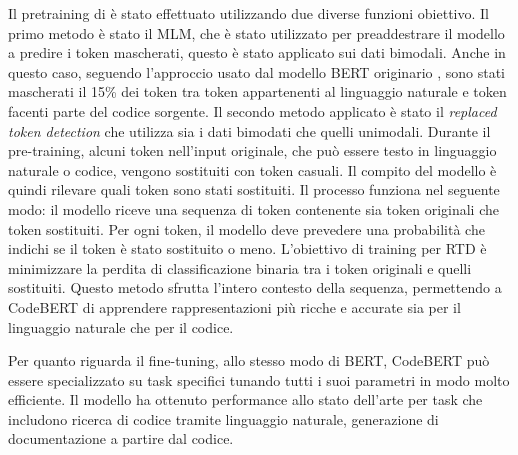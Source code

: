 \documentclass[../../Thesis.tex]{subfiles}
\begin{document}
Il pretraining di è stato effettuato utilizzando due diverse funzioni obiettivo. Il primo metodo è stato il MLM, che è stato utilizzato per preaddestrare il modello a predire i token mascherati, questo è stato applicato sui dati bimodali. Anche in questo caso, seguendo l'approccio usato dal modello BERT originario \cite{BERT},  sono stati mascherati il 15\% dei token tra token appartenenti al linguaggio naturale e token facenti parte del codice sorgente. Il secondo metodo applicato è stato il \emph{replaced token detection} che utilizza sia i dati bimodati che quelli unimodali.  Durante il pre-training, alcuni token nell'input originale, che può essere testo in linguaggio naturale o codice, vengono sostituiti con token casuali. Il compito del modello è quindi rilevare quali token sono stati sostituiti. Il processo funziona nel seguente modo: il modello riceve una sequenza di token contenente sia token originali che token sostituiti. Per ogni token, il modello deve prevedere una probabilità che indichi se il token è stato sostituito o meno. L'obiettivo di training per RTD è minimizzare la perdita di classificazione binaria tra i token originali e quelli sostituiti. Questo metodo sfrutta l'intero contesto della sequenza, permettendo a CodeBERT di apprendere rappresentazioni più ricche e accurate sia per il linguaggio naturale che per il codice.

Per quanto riguarda il fine-tuning, allo stesso modo di BERT, CodeBERT può essere specializzato su task specifici tunando tutti i suoi parametri in modo molto efficiente. Il modello ha ottenuto performance allo stato dell'arte per task che includono ricerca di codice tramite linguaggio naturale, generazione di documentazione a partire dal codice. 
\end{document}
